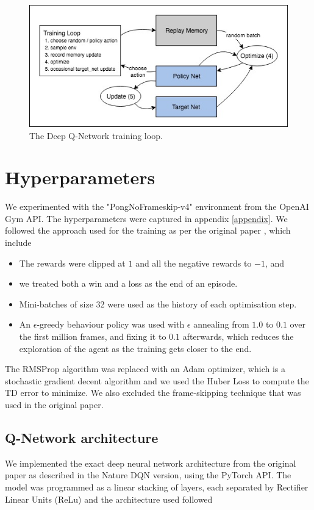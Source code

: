 \documentclass[conference]{IEEEtran}
\begin{document}
\begin{figure}[!ht]
    \centering
	\includegraphics[width=\textwidth]{resources/reinforcement_learning_diagram.jpg}
	\caption{The Deep Q-Network training loop\cite{pytorch}.}
	\label{fig:rl}
	
\end{figure}

\section{Hyperparameters}
We experimented with the "PongNoFrameskip-v4" environment from the OpenAI Gym API. The hyperparameters were captured in appendix \ref{appendix}. We followed the approach used for the training as per the original paper \cite{mnih2013playing}, which include
\begin{itemize}
    \item The rewards were clipped at $1$ and all the negative rewards to $-1$, and
    \item we treated both a win and a loss as the end of an episode.
    \item Mini-batches of size 32 were used as the history of each optimisation step.
    \item An $\epsilon$-greedy behaviour policy was used with $\epsilon$ annealing from $1.0$ to $0.1$ over the first million frames, and fixing it to $0.1$ afterwards, which reduces the exploration of the agent as the training gets closer to the end.
 \end{itemize}   
The RMSProp algorithm was replaced with an Adam optimizer, which is a stochastic gradient decent algorithm and we used the Huber Loss to compute the TD error to minimize.
We also excluded the frame-skipping technique that was used in the original paper. 

\subsection{Q-Network architecture}
We implemented the exact deep neural network architecture from the original paper as described in the Nature DQN version, using the PyTorch API. The model was programmed as a linear stacking of layers, each separated by Rectifier Linear Units (ReLu) and the architecture used followed
\end{document}
